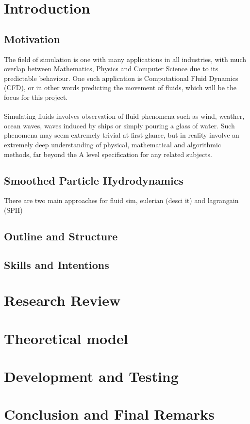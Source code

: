 \documentclass[a4paper,9pt]{article}
\begin{document}
\begin{multicols}{2}
\section{Introduction}
\subsection{Motivation}
The field of simulation is one with many applications in all industries, with much overlap between Mathematics, Physics and Computer Science due to its predictable behaviour. One such application is Computational Fluid Dynamics (CFD), or in other words predicting the movement of fluids, which will be the focus for this project.
\\~\\
\indent Simulating fluids involves observation of fluid phenomena such as wind, weather, ocean waves, waves induced by ships or simply pouring a glass of water. Such phenomena may seem extremely trivial at first glance, but in reality involve an extremely deep understanding of physical, mathematical and algorithmic methods, far beyond the A level specification for any related subjects.
\subsection{Smoothed Particle Hydrodynamics}
There are two main approaches for fluid sim, eulerian (desci it) and lagrangain (SPH)
\nocite{*}
\subsection{Outline and Structure}
\subsection{Skills and Intentions}
\section{Research Review}
\section{Theoretical model}
\section{Development and Testing}
\section{Conclusion and Final Remarks}
\end{multicols}

\newpage


\end{document}
